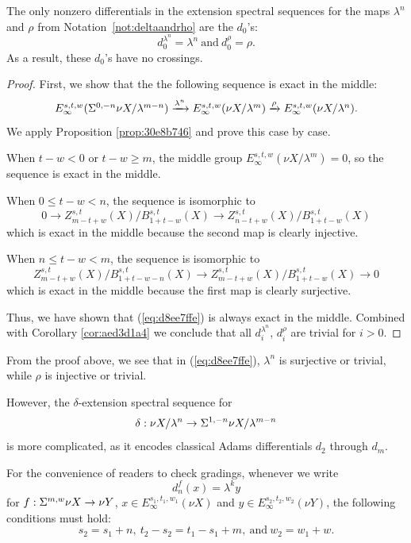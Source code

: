 \documentclass{amsart}
\numberwithin{equation}{section}
\begin{document}
\begin{proposition}\label{prop:9770ae6e} 
The only nonzero differentials in the extension spectral sequences for the maps $\lambda^n$ and $\rho$ from Notation~\ref{not:deltaandrho} are the $d_0$'s:
$$d^{\lambda^n}_0=\lambda^n \ \text{and} \ d^{\rho}_0=\rho.$$ 
As a result, these $d_0$'s have no crossings.
\end{proposition}
\begin{proof}
    First, we show that the the following sequence is exact in the middle:
    \begin{equation}\label{eq:d8ee7ffe}
        \scalebox{1}{$E_\infty^{s,t,w}(\Sus^{0,-n}\nu X/\lambda^{m-n})\fto{\lambda^n} E_\infty^{s,t,w}(\nu X/\lambda^{m})\fto{\rho} E_\infty^{s,t,w}(\nu X/\lambda^{n})$}.
    \end{equation}
    We apply Proposition \ref{prop:30e8b746} and prove this case by case.

    When $t-w<0$ or $t-w\ge m$, the middle group $E_\infty^{s,t,w}(\nu X/\lambda^{m}) = 0$, so the sequence is exact in the middle.
    
    When $0\le t-w<n$, the sequence is isomorphic to
    $$0\to Z^{s,t}_{m-t+w}(X)/B^{s,t}_{1+t-w}(X)\to Z^{s,t}_{n-t+w}(X)/B^{s,t}_{1+t-w}(X)$$
    which is exact in the middle because the second map is clearly injective.

    When $n\le t-w<m$, the sequence is isomorphic to
    $$Z^{s,t}_{m-t+w}(X)/B^{s,t}_{1+t-w-n}(X)\to Z^{s,t}_{m-t+w}(X)/B^{s,t}_{1+t-w}(X)\to 0$$
    which is exact in the middle because the first map is clearly surjective.

    Thus, we have shown that (\ref{eq:d8ee7ffe}) is always exact in the middle. Combined with Corollary \ref{cor:aed3d1a4} we conclude that all $d^{\lambda^n}_i$, $d^{\rho}_i$ are trivial for $i>0$.
\end{proof}

\begin{remark}
    From the proof above, we see that in (\ref{eq:d8ee7ffe}), $\lambda^n$ is surjective or trivial, while $\rho$ is injective or trivial.
\end{remark}

However, the $\delta$-extension spectral sequence for
$$\delta:\nu X/\lambda^n\to \Sigma^{1,-n}\nu X/\lambda^{m-n}$$
is more complicated, as it encodes classical Adams differentials $d_2$ through $d_m$.

\begin{remark}
    For the convenience of readers to check gradings, whenever we write 
    $$d_{n}^{f}(x)=\lambda^k y$$
    for $f: \Sigma^{m,w} \nu X\to \nu Y$,
    $x\in E_\infty^{s_1,t_1,w_1}(\nu X)$ and
    $y\in E_\infty^{s_2,t_2,w_2}(\nu Y)$,
    the following conditions must hold: 
    $$s_2=s_1+n, \ t_2-s_2=t_1-s_1+m, \ \text{and} \ w_2=w_1+w.$$
\end{remark}
\end{document}
